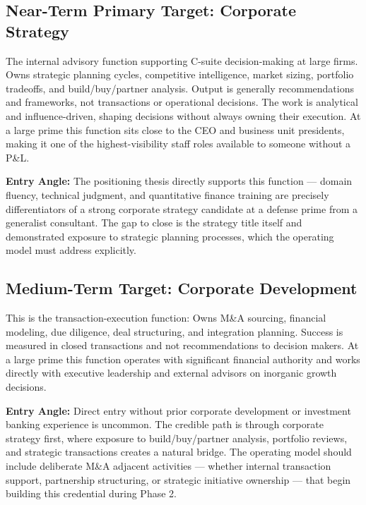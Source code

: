 \documentclass{article}
\begin{document}
\subsection{Near-Term Primary Target: Corporate Strategy}

The internal advisory function supporting C-suite decision-making at large firms. Owns strategic planning cycles, competitive
intelligence, market sizing, portfolio tradeoffs, and build/buy/partner analysis. Output is generally recommendations and 
frameworks, not transactions or operational decisions. The work is analytical and influence-driven, shaping decisions without 
always owning their execution. At a large prime this function sits close to the CEO and business unit presidents, making 
it one of the highest-visibility staff roles available to someone without a P\&L.

\textbf{Entry Angle:} The positioning thesis directly supports this function --- domain fluency, technical judgment, and quantitative
finance training are precisely differentiators of a strong corporate strategy candidate at a defense prime from a 
generalist consultant. The gap to close is the strategy title itself and demonstrated exposure to strategic planning processes, 
which the operating model must address explicitly.

\subsection{Medium-Term Target: Corporate Development}

This is the transaction-execution function: Owns M\&A sourcing, financial modeling, due diligence, deal structuring, 
and integration planning. Success is measured in closed transactions and not recommendations to decision makers.
At a large prime this function operates with significant financial authority and works directly with executive 
leadership and external advisors on inorganic growth decisions.

\textbf{Entry Angle:} Direct entry without prior corporate development or investment banking experience is uncommon. 
The credible path is through corporate strategy first, where exposure to build/buy/partner analysis, 
portfolio reviews, and strategic transactions creates a natural bridge. The operating model should include 
deliberate M\&A adjacent activities --- whether internal transaction support, partnership structuring, 
or strategic initiative ownership --- that begin building this credential during Phase 2.
\end{document}
